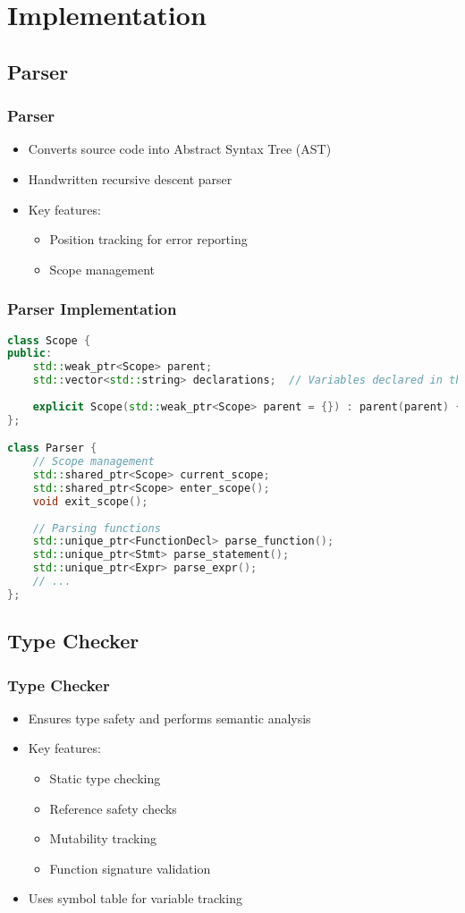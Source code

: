 \documentclass{beamer}
\begin{document}
\section{Implementation}
\subsection{Parser}
\begin{frame}
\frametitle{Parser}
\begin{itemize}
    \item Converts source code into Abstract Syntax Tree (AST)
    \item Handwritten recursive descent parser
    \item Key features:
    \begin{itemize}
        \item Position tracking for error reporting
        \item Scope management
    \end{itemize}
\end{itemize}
\end{frame}

\begin{frame}[fragile]
\frametitle{Parser Implementation}
\begin{lstlisting}[language=C++]
class Scope {
public:
    std::weak_ptr<Scope> parent;
    std::vector<std::string> declarations;  // Variables declared in this scope
    
    explicit Scope(std::weak_ptr<Scope> parent = {}) : parent(parent) {}
};

class Parser {
    // Scope management
    std::shared_ptr<Scope> current_scope;
    std::shared_ptr<Scope> enter_scope();
    void exit_scope();
    
    // Parsing functions
    std::unique_ptr<FunctionDecl> parse_function();
    std::unique_ptr<Stmt> parse_statement();
    std::unique_ptr<Expr> parse_expr();
    // ...
};
\end{lstlisting}
\end{frame}

\subsection{Type Checker}
\begin{frame}
\frametitle{Type Checker}
\begin{itemize}
    \item Ensures type safety and performs semantic analysis
    \item Key features:
    \begin{itemize}
        \item Static type checking
        \item Reference safety checks
        \item Mutability tracking
        \item Function signature validation
    \end{itemize}
    \item Uses symbol table for variable tracking
\end{itemize}
\end{frame}
\end{document}
